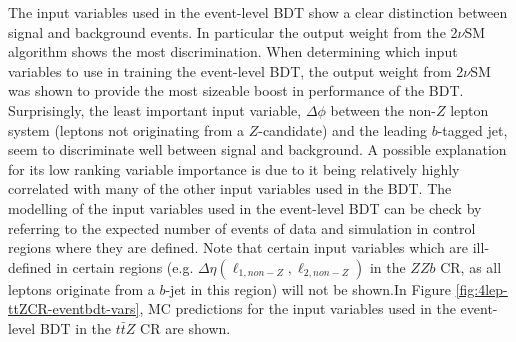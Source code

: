 The input variables used in the event-level BDT show a clear distinction between signal and background events. In particular the output weight from the 2$\nu$SM algorithm shows the most discrimination. When determining which input variables to use in training the event-level BDT, the output weight from 2$\nu$SM was shown to provide the most sizeable boost in performance of the BDT. Surprisingly, the least important input variable, $\Delta \phi$ between the non-$Z$ lepton system (leptons not originating from a $Z$-candidate) and the leading $b$-tagged jet, seem to discriminate well between signal and background. A possible explanation for its low ranking variable importance is due to it being relatively highly correlated with many of the other input variables used in the BDT. The modelling of the input variables used in the event-level BDT can be check by referring to the expected number of events of data and simulation in control regions where they are defined. Note that certain input variables which are ill-defined in certain regions (e.g. $\Delta \eta (\ell_{1,non-Z}, \ell_{2,non-Z})$ in the $ZZb$ CR, as all leptons originate from a $b$-jet in this region) will not be shown.In Figure \ref{fig:4lep-ttZCR-eventbdt-vars}, MC predictions for the input variables used in the event-level BDT in the $t\bar{t}Z$ CR are shown.
